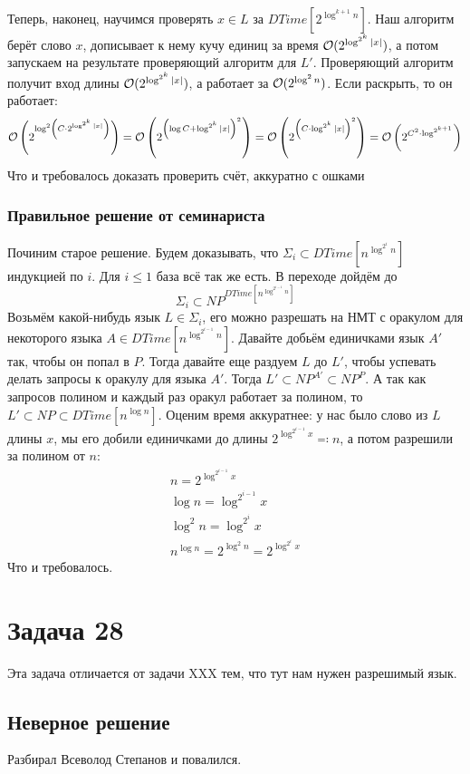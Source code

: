 		Теперь, наконец, научимся проверять $x \in L$ за $DTime[2^{\log^{k+1} n}]$.
		Наш алгоритм берёт слово $x$, дописывает к нему кучу единиц за время $\mathcal O(2^{\log^{2^k} |x|})$,
		а потом запускаем на результате проверяющий алгоритм для $L'$.
		Проверяющий алгоритм получит вход длины $\mathcal O(2^{\log^{2^k} |x|})$, а работает
		за $\mathcal O(2^{\log^2 n})$.
		Если раскрыть, то он работает:
		\[
			\mathcal O\left(2^{\log^2 \left(C \cdot 2^{\log^{2^k} |x|}\right) }\right) =
			\mathcal O\left(2^{\left(\log C + \log^{2^k} |x|\right)^2}\right) =
			\mathcal O\left(2^{\left(C \cdot \log^{2^k} |x|\right)^2}\right) =
			\mathcal O\left(2^{C^2 \cdot \log^{2^{k+1}}}\right)
		\]
		Что и требовалось доказать
		\TODO проверить счёт, аккуратно с ошками

	\subsubsection{Правильное решение от семинариста}
		Починим старое решение.
		Будем доказывать, что $\Sigma_i \subset DTime[n^{\log^{2^i} n}]$ индукцией по $i$.
		Для $i \le 1$ база всё так же есть.
		В переходе дойдём до
		\[ \Sigma_i \subset NP^{DTime[n^{\log^{2^{i-1}} n}]} \]
		Возьмём какой-нибудь язык $L\in\Sigma_i$, его можно разрешать на НМТ
		с оракулом для некоторого языка $A \in DTime[n^{\log^{2^{i-1}} n}]$.
		Давайте добьём единичками язык $A'$ так, чтобы он попал в $P$.
		Тогда давайте еще раздуем $L$ до $L'$, чтобы успевать делать запросы к оракулу
		для языка $A'$.
		Тогда $L' \subset NP^{A'} \subset NP^P$.
		А так как запросов полином и каждый раз оракул работает за полином, то $L' \subset NP \subset DTime[n^{\log n}]$.
		Оценим время аккуратнее: у нас было слово из $L$ длины $x$,
		мы его добили единичками до длины $2^{\log^{2^{i-1}} x} \eqcolon n$, а потом разрешили за полином от $n$:
		\begin{gather*}
			n = 2^{\log^{2^{i-1}} x} \\
			\log n = \log^{2^{i-1}} x \\
			\log^2 n = \log^{2^i} x \\
			n^{\log n} = 2^{\log^2n} = 2^{\log^{2^i} x}
		\end{gather*}
		Что и требовалось.

\section{Задача 28}
	Эта задача отличается от задачи XXX тем, что тут нам нужен разрешимый язык.
	\subsection{Неверное решение}
		Разбирал Всеволод Степанов и повалился.

